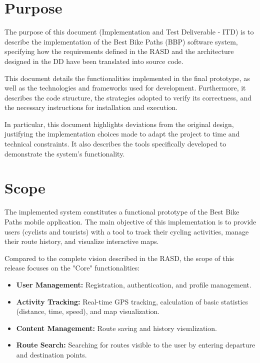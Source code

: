 \section{Purpose}
The purpose of this document (Implementation and Test Deliverable - ITD) is to describe the implementation of the Best Bike Paths (BBP) software system, specifying how the requirements defined in the RASD and the architecture designed in the DD have been translated into source code.

This document details the functionalities implemented in the final prototype, as well as the technologies and frameworks used for development. Furthermore, it describes the code structure, the strategies adopted to verify its correctness, and the necessary instructions for installation and execution.

In particular, this document highlights deviations from the original design, justifying the implementation choices made to adapt the project to time and technical constraints. It also describes the tools specifically developed to demonstrate the system's functionality.

\section{Scope}
The implemented system constitutes a functional prototype of the Best Bike Paths mobile application.
The main objective of this implementation is to provide users (cyclists and tourists) with a tool to track their cycling activities, manage their route history, and visualize interactive maps.

Compared to the complete vision described in the RASD, the scope of this release focuses on the "Core" functionalities:
\begin{itemize}
    \item \textbf{User Management:} Registration, authentication, and profile management.
    \item \textbf{Activity Tracking:} Real-time GPS tracking, calculation of basic statistics (distance, time, speed), and map visualization.
    \item \textbf{Content Management:} Route saving and history visualization.
    \item \textbf{Route Search:} Searching for routes visible to the user by entering departure and destination points.
\end{itemize}

